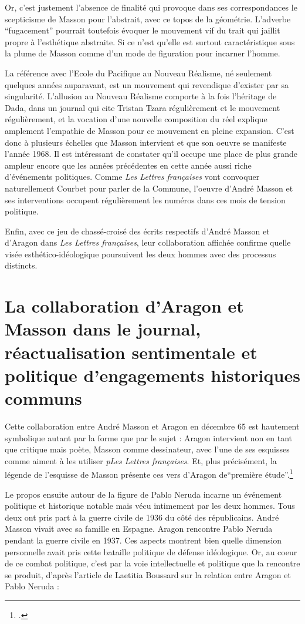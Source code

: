 	Or, c’est justement l’absence de finalité qui provoque dans ses correspondances le scepticisme de Masson pour l’abstrait, avec ce topos  de la géométrie. L’adverbe \enquote{fugacement} pourrait toutefois évoquer le mouvement vif du trait qui jaillit propre à l’esthétique abstraite. Si ce n’est qu’elle est surtout caractéristique sous la plume de Masson comme d’un mode de figuration pour incarner l’homme. 

	La référence avec l’Ecole du Pacifique au Nouveau Réalisme, né seulement quelques années auparavant, est un mouvement qui revendique d’exister par sa singularité. L’allusion au Nouveau Réalisme comporte à la fois l’héritage de Dada, dans un journal qui cite Tristan Tzara régulièrement et le mouvement régulièrement, et la vocation d’une nouvelle composition du réel explique amplement l’empathie de Masson pour ce mouvement en pleine expansion. C’est donc à plusieurs échelles que Masson intervient et que son oeuvre se manifeste l’année 1968. Il est intéressant de constater qu’il occupe une place de plus grande ampleur encore que les années précédentes en cette année aussi riche d’événements politiques. Comme \emph{Les Lettres françaises} vont convoquer naturellement Courbet pour parler de la Commune, l’oeuvre d’André Masson et ses interventions occupent régulièrement les numéros dans ces mois de tension politique. 

	Enfin, avec ce jeu de chassé-croisé des écrits respectifs d’André Masson et d’Aragon dans \emph{Les Lettres françaises}, leur collaboration affichée confirme quelle visée esthético-idéologique poursuivent les deux hommes avec des processus distincts.

\section{La collaboration d’Aragon et Masson dans le journal, réactualisation sentimentale et politique d’engagements historiques communs}

Cette collaboration entre André Masson et Aragon en décembre 65 est hautement symbolique autant par la forme que par le sujet : Aragon intervient non en tant que critique mais poète, Masson comme dessinateur, avec l’une de ses esquisses comme aiment à les utiliser \emph{pLes Lettres françaises}. Et, plus précisément, la légende de l’esquisse de Masson présente ces vers d’Aragon de\enquote{première étude}.\footcite{pabloneruda}

	 Le propos ensuite autour de la figure de Pablo Neruda incarne un événement politique et historique notable mais vécu intimement par les deux hommes. Tous deux ont pris part à la guerre civile de 1936 du côté des républicains. André Masson vivait avec sa famille en Espagne. Aragon rencontre Pablo Neruda pendant la guerre civile en 1937. Ces aspects montrent bien quelle dimension personnelle avait pris cette bataille politique de défense idéologique. Or, au coeur de ce combat politique, c’est par la voie intellectuelle et politique que la rencontre se produit, d’après l’article de Laetitia Boussard sur la relation entre Aragon et Pablo Neruda :


